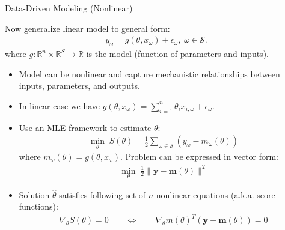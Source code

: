 \documentclass[handout,9pt]{beamer}
\begin{document}
%
\begin{frame}{Data-Driven Modeling (Nonlinear)}

Now generalize linear model to general form:
\begin{align*}
y_\omega=g(\theta, x_{\omega}) + \epsilon_\omega,\; \omega \in \mathcal{S}.
\end{align*}
where $g:\mathbb{R}^{n}\times \mathbb{R}^S\to \mathbb{R}$ is the model (function of parameters and inputs). 

\begin{itemize}
\setlength{\itemsep}{5pt}
\item Model can be nonlinear and capture mechanistic relationships between inputs, parameters, and outputs. 

\item In linear case we have $g(\theta,x_\omega)=\sum_{i=1}^n\theta_i x_{i,\omega} + \epsilon_\omega$. 

\item Use an MLE framework to estimate $\theta$:
\begin{align*}
\min_{\theta} \; S(\theta)=\frac{1}{2}\sum_{\omega \in \mathcal{S}}(y_\omega - m_\omega(\theta))
\end{align*}
where $m_\omega(\theta)=g(\theta, x_{\omega})$.  Problem can be expressed in vector form:
\begin{align*}
\min_{\theta} \; \frac{1}{2}\|\mathbf{y} - \mathbf{m}(\theta)\|^2
\end{align*}
\item Solution $\hat{\theta}$ satisfies following set of $n$ nonlinear equations (a.k.a. score functions):
\begin{align*}
\nabla_\theta S(\theta)=0\qquad \Longleftrightarrow\qquad  \nabla_\theta m(\theta)^T(\mathbf{y}-\mathbf{m}(\theta))=0
\end{align*}
\end{itemize}
\end{frame}
\end{document}
